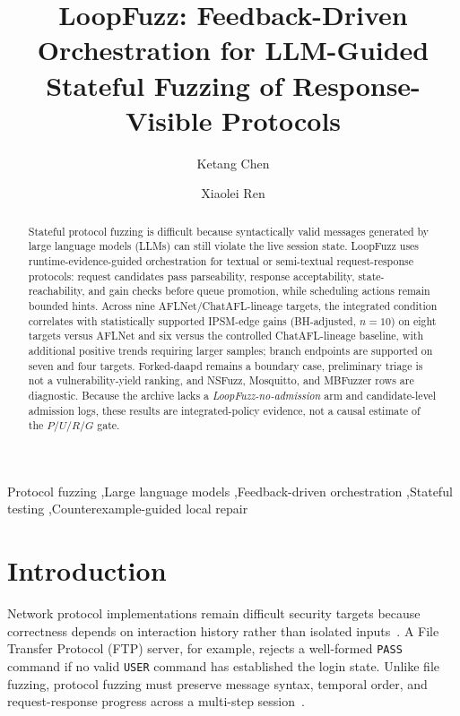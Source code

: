 \documentclass[final,5p,times,number]{elsarticle}
\begin{document}
\begin{frontmatter}

\title{LoopFuzz: Feedback-Driven Orchestration for LLM-Guided Stateful Fuzzing of Response-Visible Protocols}

\author[inst1]{Ketang Chen}
\author[inst1]{Xiaolei Ren}


\begin{abstract}
Stateful protocol fuzzing is difficult because syntactically valid messages generated by large language models (LLMs) can still violate the live session state. LoopFuzz uses runtime-evidence-guided orchestration for textual or semi-textual request-response protocols: request candidates pass parseability, response acceptability, state-reachability, and gain checks before queue promotion, while scheduling actions remain bounded hints. Across nine AFLNet/ChatAFL-lineage targets, the integrated condition correlates with statistically supported IPSM-edge gains (BH-adjusted, $n=10$) on eight targets versus AFLNet and six versus the controlled ChatAFL-lineage baseline, with additional positive trends requiring larger samples; branch endpoints are supported on seven and four targets. Forked-daapd remains a boundary case, preliminary triage is not a vulnerability-yield ranking, and NSFuzz, Mosquitto, and MBFuzzer rows are diagnostic. Because the archive lacks a \emph{LoopFuzz-no-admission} arm and candidate-level admission logs, these results are integrated-policy evidence, not a causal estimate of the $P/U/R/G$ gate.
\end{abstract}

\begin{keyword}
Protocol fuzzing \sep Large language models \sep Feedback-driven orchestration \sep Stateful testing \sep Counterexample-guided local repair
\end{keyword}

\end{frontmatter}
\small

\section{Introduction}
Network protocol implementations remain difficult security targets because correctness depends on interaction history rather than isolated inputs~\cite{aflnet,stateafl,sgf_usenix22,formatted_stateful_greybox_fuzzing_2024,resolverfuzz_query_response_2024}. A File Transfer Protocol (FTP) server, for example, rejects a well-formed \texttt{PASS} command if no valid \texttt{USER} command has established the login state. Unlike file fuzzing, protocol fuzzing must preserve message syntax, temporal order, and request-response progress across a multi-step session~\cite{resolverfuzz_query_response_2024,mbfuzzer_mqtt_2025,bleem_packet_sequence_2023,logos_log_guided_fuzzing_2024,diane_identifying_fuzzing_triggers_2021,corecrisis_context_aware_2025}.
\end{document}
